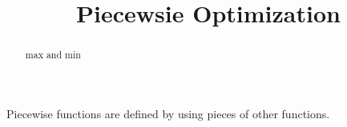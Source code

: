\documentclass{ximera}
\title{Piecewsie Optimization}
\begin{document}
\begin{abstract}
max and min
\end{abstract}
\maketitle



Piecewise functions are defined by using pieces of other functions.
\end{document}
